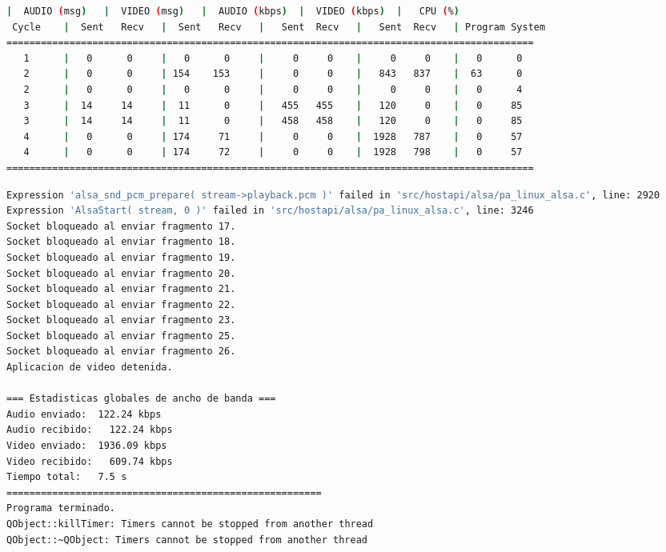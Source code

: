 \begin{adjustbox}{max width=\textwidth}
\begin{lstlisting}[language=bash,basicstyle=\ttfamily\scriptsize]
          |  AUDIO (msg)   |  VIDEO (msg)   |  AUDIO (kbps)  |  VIDEO (kbps)  |   CPU (%)
 Cycle    |  Sent   Recv   |  Sent   Recv   |   Sent  Recv   |   Sent  Recv   | Program System
============================================================================================
   1      |   0      0     |   0      0     |     0     0    |     0     0    |   0      0
   2      |   0      0     | 154    153     |     0     0    |   843   837    |  63      0
   2      |   0      0     |   0      0     |     0     0    |     0     0    |   0      4
   3      |  14     14     |  11      0     |   455   455    |   120     0    |   0     85
   3      |  14     14     |  11      0     |   458   458    |   120     0    |   0     85
   4      |   0      0     | 174     71     |     0     0    |  1928   787    |   0     57
   4      |   0      0     | 174     72     |     0     0    |  1928   798    |   0     57
============================================================================================
\end{lstlisting}
\end{adjustbox}

\begin{adjustbox}{max width=\textwidth}
\begin{lstlisting}[language=bash,basicstyle=\ttfamily\scriptsize]
Expression 'alsa_snd_pcm_prepare( stream->playback.pcm )' failed in 'src/hostapi/alsa/pa_linux_alsa.c', line: 2920
Expression 'AlsaStart( stream, 0 )' failed in 'src/hostapi/alsa/pa_linux_alsa.c', line: 3246
Socket bloqueado al enviar fragmento 17.
Socket bloqueado al enviar fragmento 18.
Socket bloqueado al enviar fragmento 19.
Socket bloqueado al enviar fragmento 20.
Socket bloqueado al enviar fragmento 21.
Socket bloqueado al enviar fragmento 22.
Socket bloqueado al enviar fragmento 23.
Socket bloqueado al enviar fragmento 25.
Socket bloqueado al enviar fragmento 26.
Aplicacion de video detenida.

=== Estadisticas globales de ancho de banda ===
Audio enviado:	122.24 kbps
Audio recibido:   122.24 kbps
Video enviado:	1936.09 kbps
Video recibido:   609.74 kbps
Tiempo total: 	7.5 s
=======================================================
Programa terminado.
QObject::killTimer: Timers cannot be stopped from another thread
QObject::~QObject: Timers cannot be stopped from another thread
\end{lstlisting}
\end{adjustbox}

